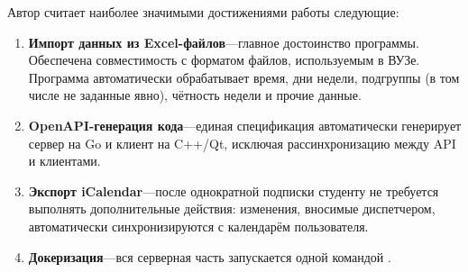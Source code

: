 Автор считает наиболее значимыми достижениями работы следующие:
\begin{enumerate}
\item \textbf{Импорт данных из Excel-файлов}---главное достоинство программы. Обеспечена совместимость с форматом файлов, используемым в ВУЗе. Программа автоматически обрабатывает время, дни недели, подгруппы (в том числе не заданные явно), чётность недели и прочие данные.
\item \textbf{OpenAPI-генерация кода}---единая спецификация автоматически генерирует сервер на Go и клиент на C++/Qt, исключая рассинхронизацию между API и клиентами.
\item \textbf{Экспорт iCalendar}---после однократной подписки студенту не требуется выполнять дополнительные действия: изменения, вносимые диспетчером, автоматически синхронизируются с календарём пользователя.
\item \textbf{Докеризация}---вся серверная часть запускается одной командой .
\end{enumerate}